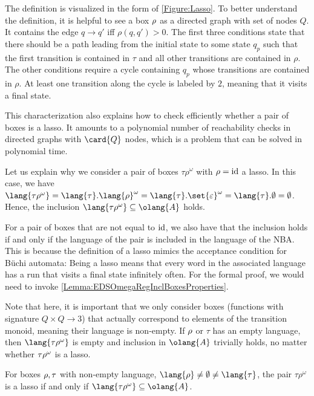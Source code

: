 \documentclass[../../diss.tex]{subfiles}
\begin{document}
The definition is visualized in the form of \cref{Figure:Lasso}.
To better understand the definition, it is helpful to see a box $\tbox$ as a directed graph with set of nodes $Q$.
It contains the edge $q \to q'$ iff $\rho(q,q') > 0$.
The first three conditions state that there should be a path leading from the initial state to some state $q_p$ such that the first transition is contained in $\tau$ and all other transitions are contained in $\rho$.
The other conditions require a cycle containing $q_p$ whose transitions are contained in $\rho$.
At least one transition along the cycle is labeled by $2$, meaning that it visits a final state.

This characterization also explains how to check efficiently whether a pair of boxes is a lasso.
It amounts to a polynomial number of reachability checks in directed graphs with $\card{Q}$ nodes, which is a problem that can be solved in polynomial time.

Let us explain why we consider a pair of boxes $\tau\rho^\omega$ with $\tbox = \id$ a lasso.
In this case, we have $\lang{\tau\rho^\omega} = \lang{\tau}.\lang{\rho}^\omega = \lang{\tau}.\set{\eps}^\omega = \lang{\tau}.\emptyset = \emptyset$.
Hence, the inclusion $\lang{\tau\rho^\omega} \subseteq \olang{A}$ holds.

For a pair of boxes that are not equal to $\text{id}$, we also have that the inclusion holds if and only if the language of the pair is included in the language of the NBA.\@
This is because the definition of a lasso mimics the acceptance condition for Büchi automata: Being a lasso means that every word in the associated language has a run that visits a final state infinitely often.
For the formal proof, we would need to invoke \cref{Lemma:EDSOmegaRegInclBoxesProperties}.

Note that here, it is important that we only consider boxes (functions with signature $Q \times Q \to 3$) that actually correspond to elements of the transition monoid, meaning their language is non-empty.
If $\tbox$ or $\tau$ has an empty language, then $\lang{\tau\tbox^\omega}$ is empty and inclusion in $\olang{A}$ trivially holds, no matter whether $\tau\tbox^\omega$ is a lasso.

\begin{lemma}%
\label{Lemma:EDSOmegaRegInclLasso}%
    For boxes $\tbox,\tau$ with non-empty language, $\lang{\tbox} \neq \emptyset \neq \lang{\tau}$, the pair $\tau\rho^\omega$ is a lasso if and only if $\lang{\tau\rho^\omega} \subseteq \olang{A}$.
\end{lemma}
\end{document}
